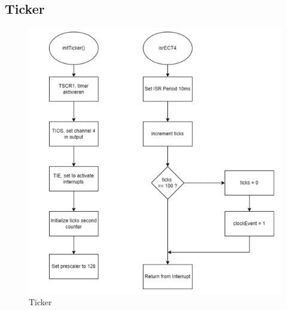 \documentclass[a4paper,12pt]{article}
\begin{document}
\subsection{Ticker}
\begin{figure}[H]
    \centering
    \includegraphics[width=1\textwidth]{diagrams/ticker.png}
    \caption{Ticker}
    \label{fig:Ticker}
\end{figure}
\end{document}
